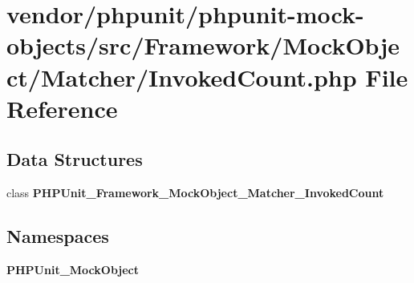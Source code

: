 \section{vendor/phpunit/phpunit-\/mock-\/objects/src/\+Framework/\+Mock\+Object/\+Matcher/\+Invoked\+Count.php File Reference}
\label{_invoked_count_8php}
\subsection*{Data Structures}
\begin{DoxyCompactItemize}
\item 
class {\bf P\+H\+P\+Unit\+\_\+\+Framework\+\_\+\+Mock\+Object\+\_\+\+Matcher\+\_\+\+Invoked\+Count}
\end{DoxyCompactItemize}
\subsection*{Namespaces}
\begin{DoxyCompactItemize}
\item 
 {\bf P\+H\+P\+Unit\+\_\+\+Mock\+Object}
\end{DoxyCompactItemize}
